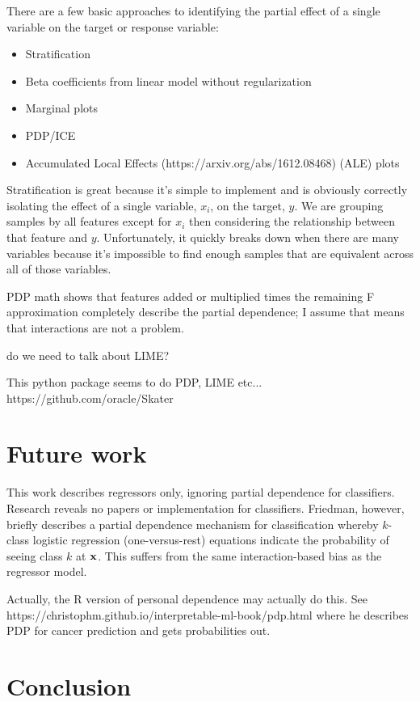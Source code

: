 \documentclass[12pt]{article}
\begin{document}
There are a few basic approaches to identifying the partial effect of a single variable on the target or response variable:

\begin{itemize}
\item Stratification
\item Beta coefficients from linear model without regularization
\item Marginal plots
\item PDP/ICE
\item Accumulated Local Effects (https://arxiv.org/abs/1612.08468) (ALE) plots
\end{itemize}

Stratification is great because it's simple to implement and is obviously correctly isolating the effect of a single variable, $x_i$, on the target, $y$. We are grouping samples by all features except for $x_i$ then considering the relationship between that feature and $y$.   Unfortunately, it quickly breaks down when there are many variables because it's impossible to find enough samples that are equivalent across all of those variables.

PDP math shows that features added or multiplied times the remaining F approximation completely describe the partial dependence; I assume that means that interactions are not a problem.

do we need to talk about LIME?
 
This python package seems to do PDP, LIME etc... https://github.com/oracle/Skater

\section{Future work}

This work describes regressors only, ignoring partial dependence for classifiers.  Research reveals no papers or implementation for classifiers. Friedman, however, briefly describes a partial dependence mechanism for classification whereby $k$-class logistic regression (one-versus-rest) equations indicate the probability of seeing class $k$ at $\bf{x}$.  This suffers from the same interaction-based bias as the regressor model.

Actually, the R version of personal dependence may actually do this. See https://christophm.github.io/interpretable-ml-book/pdp.html where he describes PDP for cancer prediction and gets probabilities out.

\section{Conclusion}
\label{sec:conc}




\end{document}
